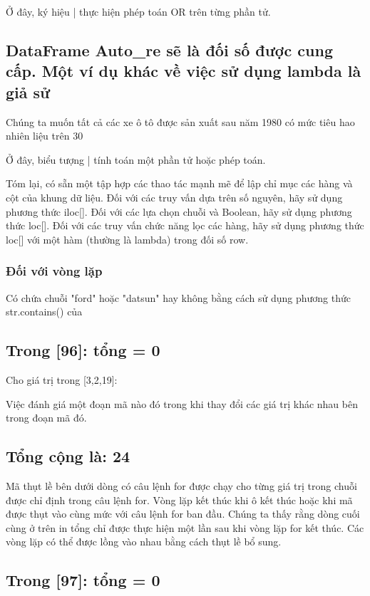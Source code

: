 Ở đây, ký hiệu | thực hiện phép toán OR trên từng phần tử.

\subsection{DataFrame Auto\_re sẽ là đối số được cung cấp. Một ví dụ khác về việc sử dụng lambda là giả sử}

Chúng ta muốn tất cả các xe ô tô được sản xuất sau năm 1980 có mức tiêu hao nhiên liệu trên 30

Ở đây, biểu tượng | tính toán một phần tử hoặc phép toán.

Tóm lại, có sẵn một tập hợp các thao tác mạnh mẽ để lập chỉ mục các hàng và cột của khung dữ liệu. Đối với các truy vấn dựa trên số nguyên, hãy sử dụng phương thức iloc[]. Đối với các lựa chọn chuỗi và Boolean, hãy sử dụng phương thức loc[]. Đối với các truy vấn chức năng lọc các hàng, hãy sử dụng phương thức loc[] với một hàm (thường là lambda) trong đối số row.

\subsubsection{Đối với vòng lặp}

Có chứa chuỗi "ford" hoặc "datsun" hay không bằng cách sử dụng phương thức str.contains() của

\subsection{Trong [96]: tổng = 0}

Cho giá trị trong [3,2,19]:

Việc đánh giá một đoạn mã nào đó trong khi thay đổi các giá trị khác nhau bên trong đoạn mã đó.

\subsection{Tổng cộng là: 24}

Mã thụt lề bên dưới dòng có câu lệnh for được chạy cho từng giá trị trong chuỗi được chỉ định trong câu lệnh for. Vòng lặp kết thúc khi ô kết thúc hoặc khi mã được thụt vào cùng mức với câu lệnh for ban đầu. Chúng ta thấy rằng dòng cuối cùng ở trên in tổng chỉ được thực hiện một lần sau khi vòng lặp for kết thúc. Các vòng lặp có thể được lồng vào nhau bằng cách thụt lề bổ sung.

\subsection{Trong [97]: tổng = 0}

